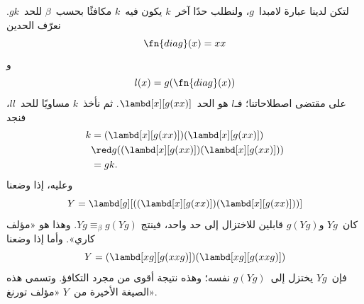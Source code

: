 \documentclass[../../../include/open-logic-section]{subfiles}
\begin{document}

لتكن لدينا عبارة لامبدا~$g$، ولنطلب حدًا آخر~$k$ يكون فيه~$k$
مكافئًا بحسب~$\beta$ للحد~$gk$. نعرّف الحدين
\[
\fn{diag}(x) = xx
\]
و
\[
l(x) = g(\fn{diag}(x))
\]
على مقتضى اصطلاحاتنا؛ فـ$l$ هو الحد~$\lambd[x][g(xx)]$.
ثم نأخذ~$k$ مساويًا للحد~$ll$، فنجد
\begin{align*}
k & = (\lambd[x][g(xx)])(\lambd[x][g(xx)]) \\
& \red  g((\lambd[x][g(xx)])(\lambd[x][g(xx)])) \\
& = gk.
\end{align*}
وعليه، إذا وضعنا
\[
Y = \lambd[g][((\lambd[x][g(xx)])(\lambd[x][g(xx)]))]
\]
كان~$Yg$ و$g(Yg)$ قابلين للاختزال إلى حد واحد، فينتج
$Yg \equiv_\beta g(Yg)$. وهذا هو «مؤلف كاري». وأما إذا وضعنا
\[
Y = (\lambd[xg][g(xxg)])(\lambd[xg][g(xxg)])
\]
فإن~$Yg$ يختزل إلى~$g(Yg)$ نفسه؛ وهذه نتيجة أقوى من مجرد التكافؤ.
وتسمى هذه الصيغة الأخيرة من~$Y$ «مؤلف تورنغ».
\end{document}
